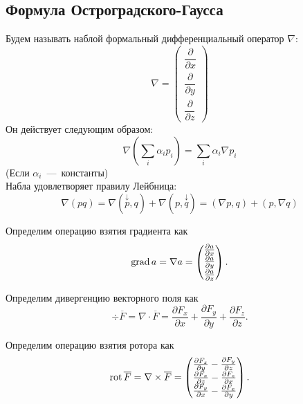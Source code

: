 \subsection{Формула Остроградского-Гаусса}
\begin{definition}
    Будем называть наблой формальный дифференциальный оператор $\nabla$: \[
        \nabla = \begin{pmatrix}
            \dfrac{\partial}{\partial x} \\ \dfrac{\partial}{\partial y} \\ \dfrac{\partial}{\partial z}
        \end{pmatrix}
    \]
    Он действует следующим образом: \[
        \nabla(\sum\limits_i \alpha_i p_i) = \sum\limits_i \alpha_i \nabla p_i
    \]
    (Если $\alpha_i$~---~константы) \\
    Набла удовлетворяет правилу Лейбница: \[
        \nabla(pq) = \nabla(\overset{\downarrow}{p}, q) + \nabla(p, \overset{\downarrow}{q}) = (\nabla p, q) + (p, \nabla q)
    \]
\end{definition}
\begin{definition}
    Определим операцию взятия градиента как \[\operatorname{grad} a = \nabla a = \begin{pmatrix}
\frac{\partial a}{\partial x} \\
\frac{\partial a}{\partial y} \\
\frac{\partial a}{\partial z}
\end{pmatrix}.
\]
\end{definition}
\begin{definition}
    Определим дивергенцию векторного поля как \[\div \overline{F} = \nabla \cdot \overline{F} = \frac{\partial F_x}{\partial x} + \frac{\partial F_y}{\partial y} + \frac{\partial F_z}{\partial z}.
\]
\end{definition}
\begin{definition}
    Определим операцию взятия ротора как \[\operatorname{rot} \overline{F} = \nabla \times \overline{F} = \begin{pmatrix}
\frac{\partial F_z}{\partial y} - \frac{\partial F_y}{\partial z} \\
\frac{\partial F_x}{\partial z} - \frac{\partial F_z}{\partial x} \\
\frac{\partial F_y}{\partial x} - \frac{\partial F_x}{\partial y}
\end{pmatrix}.
\]
\end{definition}
